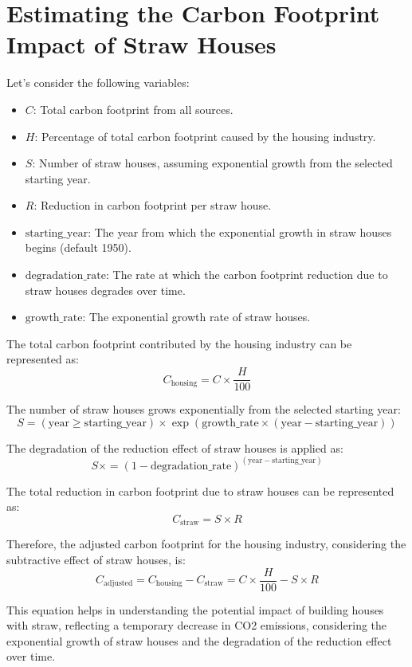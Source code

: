 \section{Estimating the Carbon Footprint Impact of Straw Houses}

Let's consider the following variables:
\begin{itemize}
    \item \( C \): Total carbon footprint from all sources.
    \item \( H \): Percentage of total carbon footprint caused by the housing industry.
    \item \( S \): Number of straw houses, assuming exponential growth from the selected starting year.
    \item \( R \): Reduction in carbon footprint per straw house.
    \item \( \text{{starting\_year}} \): The year from which the exponential growth in straw houses begins (default 1950).
    \item \( \text{{degradation\_rate}} \): The rate at which the carbon footprint reduction due to straw houses degrades over time.
    \item \( \text{{growth\_rate}} \): The exponential growth rate of straw houses.
\end{itemize}

The total carbon footprint contributed by the housing industry can be represented as:
\[
C_{\text{{housing}}} = C \times \frac{H}{100}
\]

The number of straw houses grows exponentially from the selected starting year:
\[
S = (\text{{year}} \geq \text{{starting\_year}}) \times \exp(\text{{growth\_rate}} \times (\text{{year}} - \text{{starting\_year}}))
\]

The degradation of the reduction effect of straw houses is applied as:
\[
S \times= (1 - \text{{degradation\_rate}})^{(\text{{year}} - \text{{starting\_year}})}
\]

The total reduction in carbon footprint due to straw houses can be represented as:
\[
C_{\text{{straw}}} = S \times R
\]

Therefore, the adjusted carbon footprint for the housing industry, considering the subtractive effect of straw houses, is:
\[
C_{\text{{adjusted}}} = C_{\text{{housing}}} - C_{\text{{straw}}} = C \times \frac{H}{100} - S \times R
\]

This equation helps in understanding the potential impact of building houses with straw, reflecting a temporary decrease in CO2 emissions, considering the exponential growth of straw houses and the degradation of the reduction effect over time.

